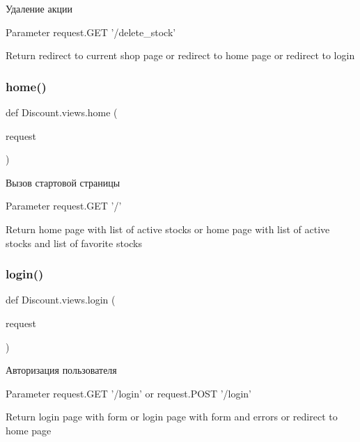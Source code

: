 \begin{DoxyVerb}Удаление акции

Parameter
    request.GET '/delete_stock'

Return
    redirect to current shop page
    or
    redirect to home page
    or
    redirect to login
\end{DoxyVerb}
 \mbox{\label{namespace_discount_1_1views_ae8581c9b9d2f9447119a4512c0d6b40f}} 
\subsubsection{\texorpdfstring{home()}{home()}}
{\footnotesize\ttfamily def Discount.\+views.\+home (\begin{DoxyParamCaption}\item[{}]{request }\end{DoxyParamCaption})}

\begin{DoxyVerb}Вызов стартовой страницы

Parameter
   request.GET '/'

Return
   home page with list of active stocks
   or
   home page with list of active stocks and list of favorite stocks
\end{DoxyVerb}
 \mbox{\label{namespace_discount_1_1views_a58edd1662d569cc6f8714bf106da6a1e}} 
\subsubsection{\texorpdfstring{login()}{login()}}
{\footnotesize\ttfamily def Discount.\+views.\+login (\begin{DoxyParamCaption}\item[{}]{request }\end{DoxyParamCaption})}

\begin{DoxyVerb}Авторизация пользователя

Parameter
    request.GET '/login' or request.POST '/login'

Return
    login page with form
    or
    login page with form and errors
    or
    redirect to home page
\end{DoxyVerb}
 \mbox{\label{namespace_discount_1_1views_a033c4753c804f383c8fefdca2b2e0566}} 
